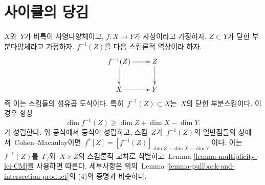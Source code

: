 \section{사이클의 당김}
\label{section-pullback-cycles}

\noindent
$X$와\  $Y$가 비특이 사영다양체이고,
$f : X \to Y$가 사상이라고 가정하자.
$Z \subset Y$가 닫힌 부분다양체라고 가정하자. $f^{-1}(Z)$를
다음 스킴론적 역상이라 하자.
$$
\xymatrix{
f^{-1}(Z) \ar[r] \ar[d] & Z \ar[d] \\
X \ar[r] & Y
}
$$
즉 이는 스킴들의 섬유곱 도식이다. 특히\ 
$f^{-1}(Z) \subset X$는\  $X$의 닫힌 부분스킴이다.
이 경우 항상
$$
\dim f^{-1}(Z) \geq \dim Z + \dim X - \dim Y.
$$
가 성립한다. 위 공식에서 등식이 성립하고, 스킴\  $Z$가\ 
$f^{-1}(Z)$의 일반점들의 상에서\  Cohen--Macaulay이면\ 
$f^*[Z] = [f^{-1}(Z)]_{\dim Z + \dim X - \dim Y}$
이다. 이는\  $f^{-1}(Z)$를\  $\Gamma_f$와\  $X \times Z$의
스킴론적 교차로 식별하고\  Lemma
\ref{lemma-multiplicity-lci-CM}을 사용하면 따른다.
세부사항은 위의\  Lemma
\ref{lemma-pullback-and-intersection-product}의 (4)의 증명과 비슷하다.











